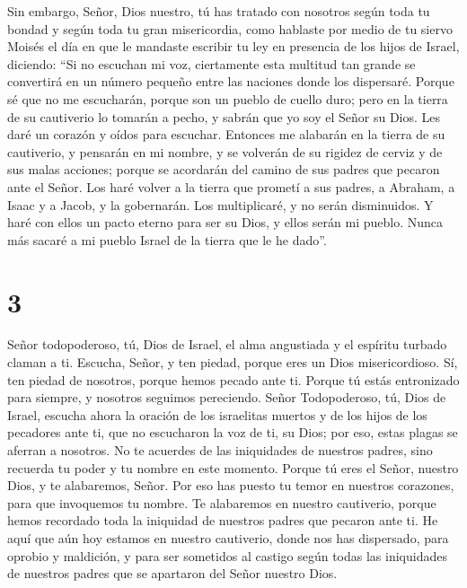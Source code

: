  Sin embargo, Señor, Dios nuestro, tú has tratado con
nosotros según toda tu bondad y según toda tu gran misericordia,
 como hablaste por medio de tu siervo Moisés el día en
que le mandaste escribir tu ley en presencia de los hijos de Israel,
diciendo:  ``Si no escuchan mi voz, ciertamente esta
multitud tan grande se convertirá en un número pequeño entre las
naciones donde los dispersaré.  Porque sé que no me
escucharán, porque son un pueblo de cuello duro; pero en la tierra de su
cautiverio lo tomarán a pecho,  y sabrán que yo soy el
Señor su Dios. Les daré un corazón y oídos para escuchar.
 Entonces me alabarán en la tierra de su cautiverio, y
pensarán en mi nombre,  y se volverán de su rigidez de
cerviz y de sus malas acciones; porque se acordarán del camino de sus
padres que pecaron ante el Señor.  Los haré volver a la
tierra que prometí a sus padres, a Abraham, a Isaac y a Jacob, y la
gobernarán. Los multiplicaré, y no serán disminuidos.  Y
haré con ellos un pacto eterno para ser su Dios, y ellos serán mi
pueblo. Nunca más sacaré a mi pueblo Israel de la tierra que le he
dado''.

\hypertarget{section-2}{%
\section{3}\label{section-2}}

 Señor todopoderoso, tú, Dios de Israel, el alma
angustiada y el espíritu turbado claman a ti.  Escucha,
Señor, y ten piedad, porque eres un Dios misericordioso. Sí, ten piedad
de nosotros, porque hemos pecado ante ti.  Porque tú estás
entronizado para siempre, y nosotros seguimos pereciendo. 
Señor Todopoderoso, tú, Dios de Israel, escucha ahora la oración de los
israelitas muertos y de los hijos de los pecadores ante ti, que no
escucharon la voz de ti, su Dios; por eso, estas plagas se aferran a
nosotros.  No te acuerdes de las iniquidades de nuestros
padres, sino recuerda tu poder y tu nombre en este momento.
 Porque tú eres el Señor, nuestro Dios, y te alabaremos,
Señor.  Por eso has puesto tu temor en nuestros corazones,
para que invoquemos tu nombre. Te alabaremos en nuestro cautiverio,
porque hemos recordado toda la iniquidad de nuestros padres que pecaron
ante ti.  He aquí que aún hoy estamos en nuestro
cautiverio, donde nos has dispersado, para oprobio y maldición, y para
ser sometidos al castigo según todas las iniquidades de nuestros padres
que se apartaron del Señor nuestro Dios.

